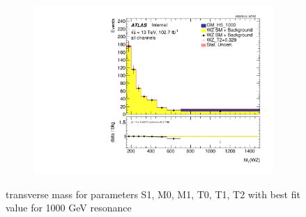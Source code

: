 \documentclass[../Bachelorarbeit.tex]{subfiles}
\begin{document}
\begin{figure}[h]
\begin{subfigure}{0.35\textwidth}
    \end{subfigure}
    \begin{subfigure}{0.35\textwidth}
        \includegraphics[width=\textwidth]{Plots/ALL_MTWZ_right_color/GM_H5_1000/T2/2022-05-07/VBSSR/all_VV_MTWZ.pdf}
    \end{subfigure}

    \caption{transverse mass for parameters S1, M0, M1, T0, T1, T2 with best fit value for 1000 GeV resonance}
    \label{fig:all_mtwz_1000}
\end{figure}
\end{document}
